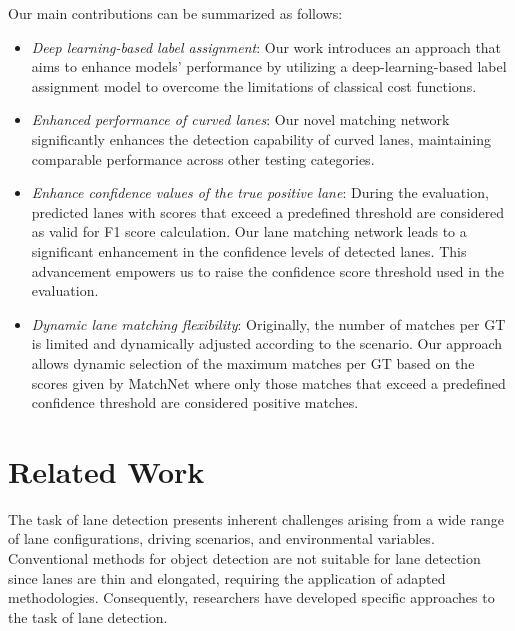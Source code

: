 \documentclass[10pt,twocolumn,letterpaper]{article}
\begin{document}
Our main contributions can be summarized as follows:
\begin{itemize}
    \item \textit{Deep learning-based label assignment}: Our work introduces an approach that aims to enhance models' performance by utilizing a deep-learning-based label assignment model to overcome the limitations of classical cost functions.
    \item \textit{Enhanced performance of curved lanes}: Our novel matching network significantly enhances the detection capability of curved lanes, maintaining comparable performance across other testing categories.
    \item \textit{Enhance confidence values of the true positive lane}: During the evaluation, predicted lanes with scores that exceed a predefined threshold are considered as valid for F1 score calculation. Our lane matching network leads to a significant enhancement in the confidence levels of detected lanes. This advancement empowers us to raise the confidence score threshold used in the evaluation.
    \item \textit{Dynamic lane matching flexibility}: Originally, the number of matches per GT is limited and dynamically adjusted according to the scenario. Our approach allows dynamic selection of the maximum matches per GT based on the scores given by MatchNet where only those matches that exceed a predefined confidence threshold are considered positive matches. 
\end{itemize}


\section{Related Work}
\label{sec:relatedwork}
The task of lane detection presents inherent challenges arising from a wide range of lane configurations, driving scenarios, and environmental variables. Conventional methods for object detection are not suitable for lane detection since lanes are thin and elongated, requiring the application of adapted methodologies. Consequently, researchers have developed specific approaches to the task of lane detection. 
\end{document}
